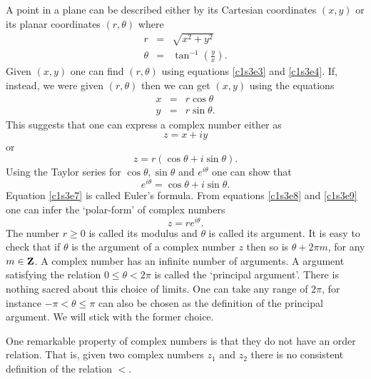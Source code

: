 A point in a plane can be described either by its Cartesian coordinates 
$(x, y)$ or its planar coordinates $(r, \theta)$ where
\begin{eqnarray}
r &=& \sqrt{x^2 + y^2} \label{c1s3e3} \\
\theta &=& \tan^{-1}\left(\frac{y}{x}\right). \label{c1s3e4}
\end{eqnarray}
Given $(x, y)$ one can find $(r, \theta)$ using equations \eqref{c1s3e3} and 
\eqref{c1s3e4}. If, instead, we were given $(r, \theta)$ then we can get 
$(x, y)$ using the equations
\begin{eqnarray}
x &=& r\cos\theta \label{c1s3e5} \\
y &=& r\sin\theta. \label{c1s3e6}
\end{eqnarray}
This suggests that one can express a complex number either as 
\begin{equation}\label{c1s3e7}
z = x + iy
\end{equation}
or 
\begin{equation}\label{c1s3e8}
z = r(\cos\theta + i\sin\theta).
\end{equation}
Using the Taylor series for $\cos\theta, \sin\theta$ and $e^{i\theta}$ one can 
show that
\begin{equation}\label{c1s3e9}
e^{i\theta} = \cos\theta + i\sin\theta.
\end{equation}
Equation \eqref{c1s3e7} is called Euler's formula. From equations \eqref{c1s3e8}
and \eqref{c1s3e9} one can infer the `polar-form' of complex numbers
\begin{equation}\label{c1s3e10}
z = re^{i\theta}.
\end{equation}
The number $r \ge 0$ is called its modulus and $\theta$ is called its argument.
It is easy to check that if $\theta$ is the argument of a complex number $z$
then so is $\theta + 2\pi m$, for any $m \in \mathbf{Z}$. A complex number has an
infinite number of arguments. A argument satisfying the relation $0 \le \theta
< 2\pi$ is called the `principal argument'. There is nothing sacred about this
choice of limits. One can take any range of $2\pi$, for instance $-\pi < \theta
\le \pi$ can also be chosen as the definition of the principal argument. We will
stick with the former choice.

One remarkable property of complex numbers is that they do not have an order
relation. That is, given two complex numbers $z_1$ and $z_2$ there is no
consistent definition of the relation $<$.

